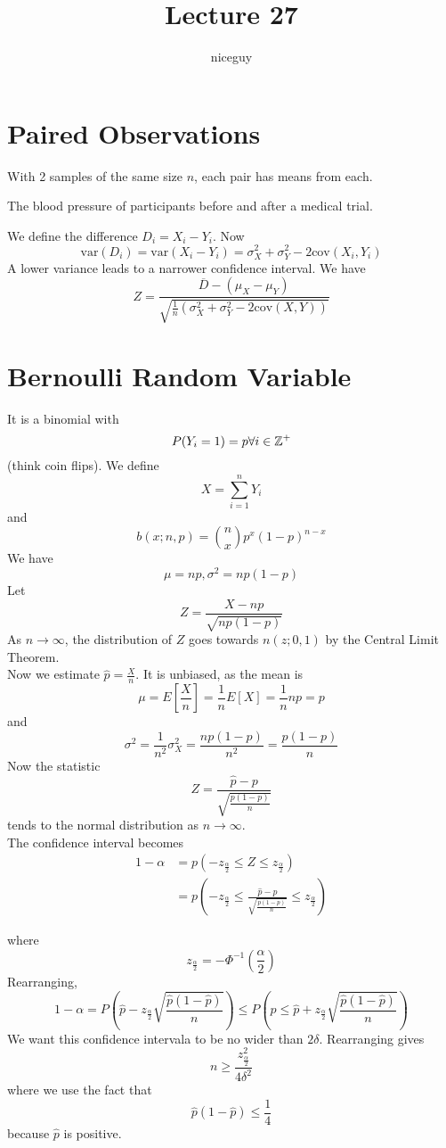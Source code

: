 \documentclass[12pt]{article}
\author{niceguy}
\title{Lecture 27}
\begin{document}
\maketitle

\section{Paired Observations}
With 2 samples of the same size $n$, each pair has means from each.

\begin{ex}
	The blood pressure of participants before and after a medical trial.
\end{ex}

We define the difference $D_i = X_i-Y_i$. Now
$$\text{var}(D_i) = \text{var}(X_i-Y_i) = \sigma_X^2 + \sigma_Y^2 - 2\text{cov}(X_i,Y_i)$$
A lower variance leads to a narrower confidence interval. We have
$$Z = \frac{\overline{D}-(\mu_X-\mu_Y)}{\sqrt{\frac{1}{n}(\sigma_X^2+\sigma_Y^2-2\text{cov}(X,Y))}}$$

\section{Bernoulli Random Variable}

It is a binomial with
$$P(Y_i = 1) = p \forall i \in \mathbb{Z}^+$$
(think coin flips). We define
$$X = \sum_{i=1}^n Y_i$$
and
$$b(x;n,p) = \binom{n}{x}p^x(1-p)^{n-x}$$
We have
$$\mu = np, \sigma^2 = np(1-p)$$
Let
$$Z = \frac{X-np}{\sqrt{np(1-p)}}$$
As $n \rightarrow \infty$, the distribution of $Z$ goes towards $n(z;0,1)$ by the Central Limit Theorem. \\
Now we estimate $\hat{p} = \frac{X}{n}$. It is unbiased, as the mean is
$$\mu = E\left[\frac{X}{n}\right] = \frac{1}{n}E[X] = \frac{1}{n}np = p$$
and
$$\sigma^2 = \frac{1}{n^2} \sigma_X^2 = \frac{np(1-p)}{n^2} = \frac{p(1-p)}{n}$$
Now the statistic
$$Z = \frac{\hat{p}-p}{\sqrt{\frac{p(1-p)}{n}}}$$
tends to the normal distribution as $n \rightarrow \infty$. \\
The confidence interval becomes
\begin{align*}
	1 - \alpha &= p(-z_{\frac{\alpha}{2}} \leq Z \leq z_{\frac{\alpha}{2}}) \\
		   &= p(-z_{\frac{\alpha}{2}} \leq \frac{\hat p - p}{\sqrt{\frac{p(1-p)}{n}}} \leq z_{\frac{\alpha}{2}})
\end{align*}

where
$$z_{\frac{\alpha}{2}} = -\Phi^{-1}\left(\frac{\alpha}{2}\right)$$
Rearranging,
$$1 - \alpha = P\left(\hat p - z_{\frac{\alpha}{2}}\sqrt{\frac{\hat p (1-\hat p )}{n}}\right) \leq P\left(p \leq \hat p + z_{\frac{\alpha}{2}}\sqrt{\frac{\hat p (1-\hat p )}{n}}\right)$$
We want this confidence intervala to be no wider than $2\delta$. Rearranging gives
$$n \geq \frac{z^2_{\frac{\alpha}{2}}}{4\delta^2}$$
where we use the fact that
$$\hat{p}(1-\hat{p}) \leq \frac{1}{4}$$
because $\hat p$ is positive.
\end{document}
